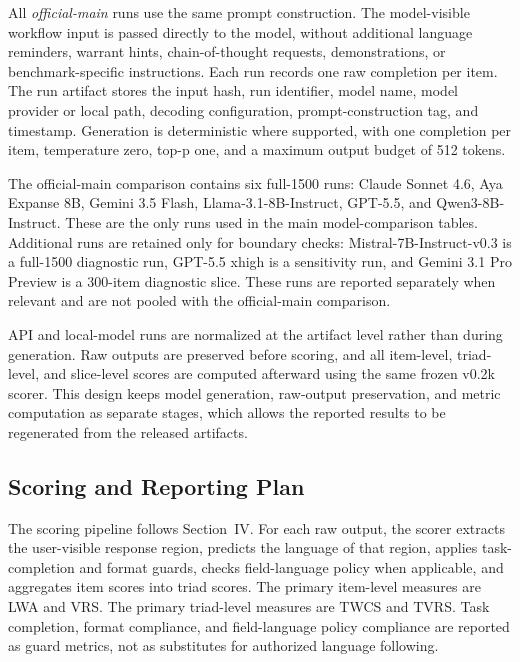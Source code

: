 \documentclass[10pt,conference]{IEEEtran}
\newcommand{\metric}[1]{\textsc{#1}}
\begin{document}
All \emph{official-main} runs use the same prompt construction. The model-visible workflow input is passed directly to the model, without additional language reminders, warrant hints, chain-of-thought requests, demonstrations, or benchmark-specific instructions. Each run records one raw completion per item. The run artifact stores the input hash, run identifier, model name, model provider or local path, decoding configuration, prompt-construction tag, and timestamp. Generation is deterministic where supported, with one completion per item, temperature zero, top-p one, and a maximum output budget of 512 tokens.

The official-main comparison contains six full-1500 runs: Claude Sonnet 4.6, Aya Expanse 8B, Gemini 3.5 Flash, Llama-3.1-8B-Instruct, GPT-5.5, and Qwen3-8B-Instruct. These are the only runs used in the main model-comparison tables. Additional runs are retained only for boundary checks: Mistral-7B-Instruct-v0.3 is a full-1500 diagnostic run, GPT-5.5 xhigh is a sensitivity run, and Gemini 3.1 Pro Preview is a 300-item diagnostic slice. These runs are reported separately when relevant and are not pooled with the official-main comparison.

API and local-model runs are normalized at the artifact level rather than during generation. Raw outputs are preserved before scoring, and all item-level, triad-level, and slice-level scores are computed afterward using the same frozen v0.2k scorer. This design keeps model generation, raw-output preservation, and metric computation as separate stages, which allows the reported results to be regenerated from the released artifacts.

\subsection{Scoring and Reporting Plan}

The scoring pipeline follows Section~IV. For each raw output, the scorer extracts the user-visible response region, predicts the language of that region, applies task-completion and format guards, checks field-language policy when applicable, and aggregates item scores into triad scores. The primary item-level measures are \metric{LWA} and \metric{VRS}. The primary triad-level measures are \metric{TWCS} and \metric{TVRS}. Task completion, format compliance, and field-language policy compliance are reported as guard metrics, not as substitutes for authorized language following.
\end{document}
